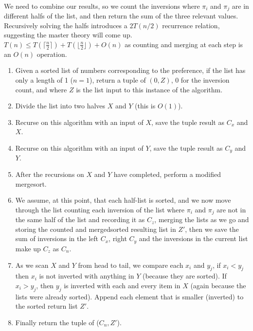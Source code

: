 \documentclass{article}
\begin{document}
\paragraph{\indent}
We need to combine our results, so we count the inversions where \(\pi_i\) and \(\pi_j\)
are in different halfs of the list, and then return the sum of the three relevant values.
Recursively solving the halfs introduces a \(2T(n/2)\) recurrence relation, suggesting the
master theory will come up. \(T(n) \leq T(\lceil \frac{n}{2} \rceil) + T(\lfloor \frac{n}{2}\rfloor)
+ O(n)\)
as counting and merging at each step is an \(O(n)\) operation.
\begin{enumerate}
      \item Given a sorted list of numbers corresponding to the preference, if the list has
            only a length of 1 (\(n=1\)), return a tuple of \((0, Z)\), 0 for the inversion
            count, and where \(Z \) is the
            list input to this instance of the algorithm.
      \item Divide the list into two halves \(X\) and \(Y\) (this is \(O(1)\)).
      \item Recurse on this algorithm with an input of \(X\), save the tuple result as
            \(C_x\) and \(X\).
      \item Recurse on this algorithm with an input of \(Y\), save the tuple result as
            \(C_y\) and \(Y\).
      \item After the recursions on \(X\) and \(Y\) have completed, perform a modified mergesort.
      \item We assume, at this point, that each half-list is sorted, and we now move through
            the list counting each inversion of the list where \(\pi_i\) and \(\pi_j\) are
            not in the same half of the list and recording it as \(C_z\), merging the lists
            as we go and storing the counted and mergedsorted resulting list in \(Z'\), then we save the
            sum of inversions in the left \(C_x\), right \(C_y\) and the inversions in the
            current list make up \(C_z\) as \(C_n\).
      \item As we scan \(X\) and \(Y\) from head to tail, we compare each \(x_i\) and
            \(y_j\), if \(x_i < y_j\) then \(x_i\) is not inverted with anything in \(Y\)
            (because they are sorted). If \(x_i > y_j\), then \(y_j\) is inverted with each
            and every item in \(X\) (again because the lists were already sorted). Append
            each element that is smaller (inverted) to the sorted return list \(Z'\).
      \item Finally return the tuple of
            (\(C_n, Z'\)).

\end{enumerate}
\end{document}
